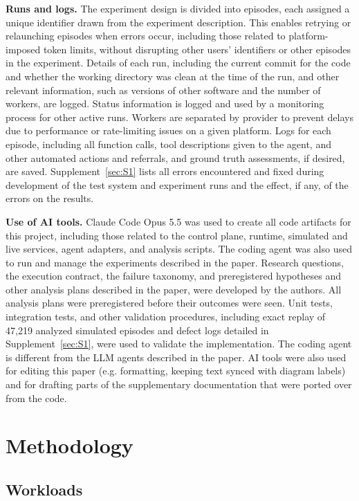 \documentclass[letterpaper,twocolumn,10pt]{article}
\begin{document}
\textbf{Runs and logs.} The experiment design is divided into episodes, each assigned a unique identifier drawn from the experiment description. This enables retrying or relaunching episodes when errors occur, including those related to platform-imposed token limits, without disrupting other users' identifiers or other episodes in the experiment. Details of each run, including the current commit for the code and whether the working directory was clean at the time of the run, and other relevant information, such as versions of other software and the number of workers, are logged. Status information is logged and used by a monitoring process for other active runs. Workers are separated by provider to prevent delays due to performance or rate-limiting issues on a given platform. Logs for each episode, including all function calls, tool descriptions given to the agent, and other automated actions and referrals, and ground truth assessments, if desired, are saved. Supplement~\ref{sec:S1} lists all errors encountered and fixed during development of the test system and experiment runs and the effect, if any, of the errors on the results.

\textbf{Use of AI tools.} Claude Code Opus 5.5 was used to create all code artifacts for this project, including those related to the control plane, runtime, simulated and live services, agent adapters, and analysis scripts. The coding agent was also used to run and manage the experiments described in the paper. Research questions, the execution contract, the failure taxonomy, and preregistered hypotheses and other analysis plans described in the paper, were developed by the authors. All analysis plans were preregistered before their outcomes were seen. Unit tests, integration tests, and other validation procedures, including exact replay of 47,219 analyzed simulated episodes and defect logs detailed in Supplement~\ref{sec:S1}, were used to validate the implementation. The coding agent is different from the LLM agents described in the paper. AI tools were also used for editing this paper (e.g. formatting, keeping text synced with diagram labels) and for drafting parts of the supplementary documentation that were ported over from the code.

\section{Methodology}\label{sec:6}

\subsection{Workloads}\label{sec:6.1}
\end{document}
